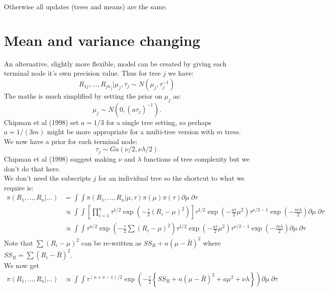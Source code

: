 \documentclass{article}
\begin{document}
Otherwise all updates (trees and means) are the same.

\section*{Mean and variance changing}

An alternative, slightly more flexible, model can be created by giving each terminal node it's own precision value. Thus for tree $j$ we have:
$$ R_{1j}, \ldots, R_{jn_j} | \mu_j, \tau_j \sim N(\mu_j, \tau_j^{-1})$$
The maths is much simplified by setting the prior on $\mu_j$ as:
$$\mu_j \sim N(0, (a \tau_j)^{-1}).$$
Chipman et al (1998) set $a = 1/3$ for a single tree setting, so perhaps $a = 1/(3m)$ might be more appropriate for a multi-tree version with $m$ trees.\\

We now have a prior for each terminal node:
$$\tau_j \sim Ga(\nu/2, \nu \lambda / 2)$$
Chipman et al (1998) suggest making $\nu$ and $\lambda$ functions of tree complexity but we don't do that here.\\

We don't need the subscripts $j$ for an individual tree so the shortcut to what we require is:
\begin{align*}
\pi(R_1, \ldots, R_n| \ldots ) &= \int \int \pi(R_1, \ldots, R_n| \mu, \tau) \pi(\mu) \pi(\tau) \partial \mu \; \partial \tau \\
&\propto \int \int \left[ \prod_{i=1}^n \tau^{1/2} \exp \left(-\frac{\tau}{2} (R_i - \mu)^2 \right) \right]\tau^{1/2} \exp \left(-\frac{a \tau}{2} \mu^2 \right) \tau^{\nu/2 - 1} \exp \left( - \frac{\tau \nu \lambda} {2} \right) \partial \mu \; \partial \tau \\
&\propto \int \int \tau^{n/2} \exp \left(-\frac{\tau}{2} \sum (R_i - \mu)^2 \right) \tau^{1/2} \exp \left(-\frac{a \tau}{2} \mu^2 \right) \tau^{\nu/2 - 1} \exp \left( - \frac{\tau \nu \lambda} {2} \right) \partial \mu \; \partial \tau 
\end{align*}
Note that $\sum (R_i - \mu)^2$ can be re-written as $SS_{R} + n(\mu - \bar{R})^2$ where $SS_R = \sum (R_i - \bar{R})^2$.\\

We now get
\begin{align*}
\pi(R_1, \ldots, R_n| \ldots ) &\propto \int \int  \tau^{(n+\nu - 1)/2} \exp \left(-\frac{\tau}{2} \left\{ SS_{R} + n(\mu - \bar{R})^2  + a \mu^2 + \nu \lambda \right\} \right) \partial \mu \; \partial \tau
\end{align*}
\end{document}
